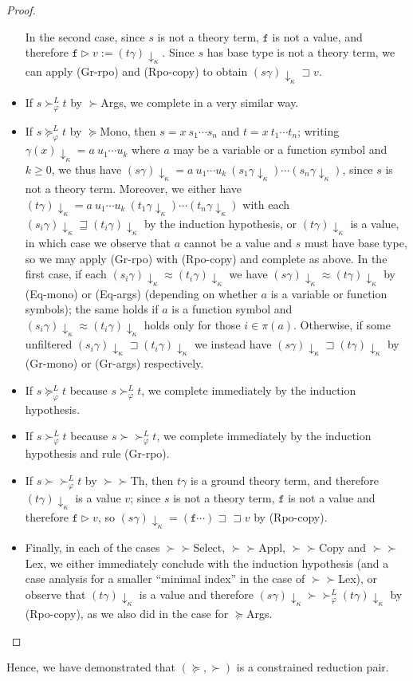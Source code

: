\documentclass[a4paper,USenglish,cleveref,autoref,thm-restate]{lipics-v2021}
\newcommand{\gtvA}{L}
\newcommand{\downarrowcalc}{\downarrow_\kappa}
\newcommand{\grmain}{\sqsupset}
\newcommand{\geqmain}{\sqsupseteq}
\newcommand{\ismain}{\approx}
\newcommand{\rpomain}{\sqsupset\!\!\sqsupset}
\newcommand{\geqth}{\succeq_\varphi^\gtvA}
\newcommand{\grth}{\succ_\varphi^\gtvA}
\newcommand{\rpoth}{\succ\!\!\!\succ_\varphi^\gtvA}
\newcommand{\rpo}{\succ\!\!\!\succ}
\newcommand{\grpred}{\rhd}
\newcommand{\symb}[1]{\mathtt{#1}}
\newcommand{\afun}{\symb{f}}
\newcommand{\filter}{\pi}
\begin{document}
\begin{proof}
\begin{itemize}
  In the second case, since $s$ is not a theory term, $\afun$ is not a value, and therefore
  $\afun \grpred v := (t\gamma)\downarrowcalc$.  Since $s$ has base type is not a theory term, we
  can apply (Gr-rpo) and (Rpo-copy) to obtain $(s\gamma)\downarrowcalc \grmain v$.
\item If $s \grth t$ by $\succ$Args, we complete in a very similar way.
\item If $s \geqth t$ by $\succeq$Mono, then $s = x\ s_1 \cdots s_n$ and $t = x\ t_1 \cdots t_n$;
  writing $\gamma(x)\downarrowcalc = a\ u_1 \cdots u_k$ where $a$ may be a variable or a function
  symbol and $k \geq 0$, we thus have $(s\gamma)\downarrowcalc = a\ u_1 \cdots u_k\ (s_1\gamma
  \downarrowcalc) \cdots (s_n\gamma\downarrowcalc)$, since $s$ is not a theory term.  Moreover, we
  either have $(t\gamma)\downarrowcalc = a\ u_1 \cdots u_k\ (t_1\gamma\downarrowcalc) \cdots
  (t_n\gamma\downarrowcalc)$ with each $(s_i\gamma)\downarrowcalc \geqmain (t_i\gamma)
  \downarrowcalc$ by the induction hypothesis, or $(t\gamma)\downarrowcalc$ is a value, in which
  case we observe that $a$ cannot be a value and $s$ must have base type, so we may apply
  (Gr-rpo) with (Rpo-copy) and complete as above.
  In the first case, if each $(s_i\gamma)\downarrowcalc \ismain (t_i\gamma)\downarrowcalc$ we have
  $(s\gamma)\downarrowcalc \ismain (t\gamma)\downarrowcalc$ by (Eq-mono) or (Eq-args) (depending
  on whether $a$ is a variable or function symbols); the same holds if $a$ is a function symbol and
  $(s_i\gamma)\downarrowcalc \ismain (t_i\gamma)\downarrowcalc$ holds only for those $i \in
  \filter(a)$.  Otherwise, if some unfiltered $(s_i\gamma)\downarrowcalc \grmain
  (t_i\gamma)\downarrowcalc$ we instead have
  $(s\gamma)\downarrowcalc \grmain (t\gamma)\downarrowcalc$ by (Gr-mono) or (Gr-args) respectively.
\item If $s \geqth t$ because $s \grth t$, we complete immediately by the induction hypothesis.
\item If $s \grth t$ because $s \rpoth t$, we complete immediately by the induction hypothesis and
  rule (Gr-rpo).
\item If $s \rpoth t$ by $\rpo$Th, then $t\gamma$ is a ground theory term, and therefore
  $(t\gamma)\downarrowcalc$ is a value $v$; since $s$ is not a theory term, $\afun$ is not a value
  and therefore $\afun \grpred v$, so $(s\gamma)\downarrowcalc = (\afun \cdots) \rpomain v$ by
  (Rpo-copy).
\item Finally, in each of the cases $\rpo$Select, $\rpo$Appl, $\rpo$Copy and $\rpo$Lex, we either
  immediately conclude with the induction hypothesis (and a case analysis for a smaller ``minimal
  index'' in the case of $\rpo$Lex), or observe that $(t\gamma)\downarrowcalc$ is a value and
  therefore $(s\gamma)\downarrowcalc \rpoth (t\gamma)\downarrowcalc$ by (Rpo-copy), as we also did
  in the case for $\succeq$Args.
  \qedhere
\end{itemize}
\end{proof}

Hence, we have demonstrated that $(\succeq,\succ)$ is a constrained reduction pair.


\end{document}
